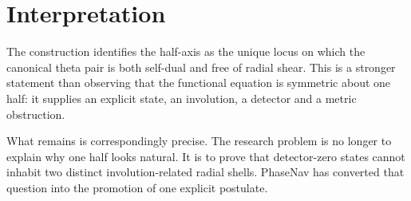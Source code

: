\section{Interpretation}

The construction identifies the half-axis as the unique locus on which the
canonical theta pair is both self-dual and free of radial shear.  This is a
stronger statement than observing that the functional equation is symmetric
about one half: it supplies an explicit state, an involution, a detector and a
metric obstruction.

What remains is correspondingly precise.  The research problem is no longer to
explain why one half looks natural.  It is to prove that detector-zero states
cannot inhabit two distinct involution-related radial shells.  PhaseNav has
converted that question into the promotion of one explicit postulate.

